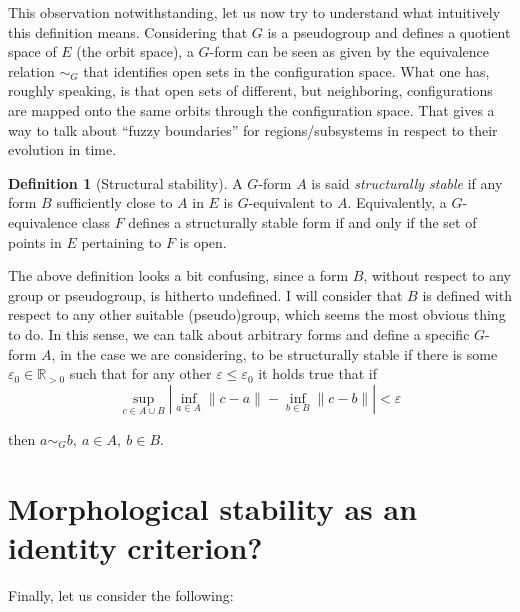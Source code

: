 \documentclass[12pt, a4paper]{article} %
\theoremstyle{definition}
\newtheorem{definition}{Definition}[section]
\begin{document}
	This observation notwithstanding, let us now try to understand what intuitively this definition means. Considering that $G$ is a pseudogroup and defines a quotient space of $E$ (the orbit space), a $G$-form can be seen as given by the equivalence relation $\sim_G$ that identifies open sets in the configuration space. What one has, roughly speaking, is that open sets of different, but neighboring, configurations are mapped onto the same orbits through the configuration space. That gives a way to talk about ``fuzzy boundaries'' for regions/subsystems in respect to their evolution in time.
	
	
	\begin{definition}[Structural stability]
		A $G$-form $A$ is said \textit{structurally stable} if any form $B$ sufficiently close to $A$ in $E$ is $G$-equivalent to $A$. Equivalently, a $G$-equivalence class $F$ defines a structurally stable form if and only if the set of points in $E$ pertaining to $F$ is open.
	\end{definition}
	
	The above definition looks a bit confusing, since a form $B$, without respect to any group or pseudogroup, is hitherto undefined. I will consider that $B$ is defined with respect to any other suitable (pseudo)group, which seems the most obvious thing to do. In this sense, we can talk about arbitrary forms and define a specific $G$-form $A$, in the case we are considering, to be structurally stable if there is some $\varepsilon_0 \in \mathbb{R}_{> 0}$ such that for any other $\varepsilon \leq \varepsilon_0$ it holds true that if
	\[\sup_{c \in A \cup B} | \inf_{a \in A} \|c - a \| - \inf_{b \in B} \|c - b \| | < \varepsilon
	\]
	
	then $a \sim_G b, \ a \in A,\ b \in B$.
	
	\section{Morphological stability as an identity criterion?}
	
	Finally, let us consider the following:
	
\end{document}
